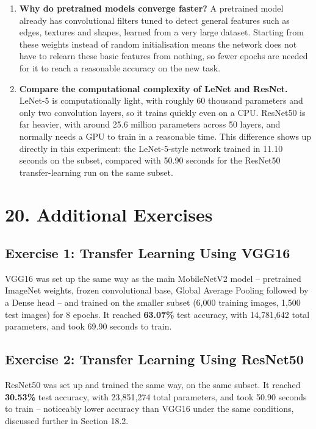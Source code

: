 \documentclass[11pt]{article}
\begin{document}
\begin{enumerate}
\item \textbf{Why do pretrained models converge faster?}
A pretrained model already has convolutional filters tuned to detect
general features such as edges, textures and shapes, learned from a very
large dataset. Starting from these weights instead of random
initialisation means the network does not have to relearn these basic
features from nothing, so fewer epochs are needed for it to reach a
reasonable accuracy on the new task.

\item \textbf{Compare the computational complexity of LeNet and ResNet.}
LeNet-5 is computationally light, with roughly 60 thousand parameters and
only two convolution layers, so it trains quickly even on a CPU. ResNet50
is far heavier, with around 25.6 million parameters across 50 layers, and
normally needs a GPU to train in a reasonable time. This difference shows
up directly in this experiment: the LeNet-5-style network trained in
11.10 seconds on the subset, compared with 50.90 seconds for the ResNet50
transfer-learning run on the same subset.

\end{enumerate}


\section*{20. Additional Exercises}

\subsection*{Exercise 1: Transfer Learning Using VGG16}

VGG16 was set up the same way as the main MobileNetV2 model -- pretrained
ImageNet weights, frozen convolutional base, Global Average Pooling
followed by a Dense head -- and trained on the smaller subset (6,000
training images, 1,500 test images) for 8 epochs. It reached
\textbf{63.07\%} test accuracy, with 14,781,642 total parameters, and
took 69.90 seconds to train.

\subsection*{Exercise 2: Transfer Learning Using ResNet50}

ResNet50 was set up and trained the same way, on the same subset. It
reached \textbf{30.53\%} test accuracy, with 23,851,274 total parameters,
and took 50.90 seconds to train -- noticeably lower accuracy than VGG16
under the same conditions, discussed further in Section 18.2.
\end{document}
